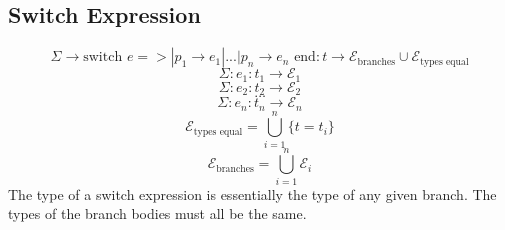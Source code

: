 \documentclass[titlepage]{article}
\begin{document}
\subsection{Switch Expression}


$$\Sigma \rightarrow \text{switch } e => | p_1 \rightarrow e_1 | ... | p_n \rightarrow e_n \text{ end} : t \rightarrow \mathcal{E}_\text{branches} \cup \mathcal{E}_\text{types equal}$$
\noindent\makebox[\linewidth]{\rule{4.9in}{0.4pt}}
$$\Sigma : e_1 : t_1 \rightarrow \mathcal{E}_1$$
$$\Sigma : e_2 : t_2 \rightarrow \mathcal{E}_2$$
$$\dots$$
$$\Sigma : e_n : t_n \rightarrow \mathcal{E}_n$$
$$\mathcal{E}_\text{types equal} = \bigcup _ {i = 1} ^ n \{t = t_i\}$$
$$\mathcal{E}_\text{branches} = \bigcup _ {i = 1} ^ n \mathcal{E}_i$$
The type of a switch expression is essentially the type of any given branch. The types of the branch bodies must all be the same.
\end{document}
